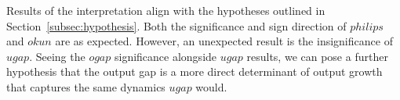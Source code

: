 \vspace{\baselineskip}
Results of the interpretation align with the hypotheses outlined in Section~\ref{subsec:hypothesis}.
Both the significance and sign direction of $philips$ and $okun$ are as expected.
However, an unexpected result is the insignificance of $ugap$.
Seeing the $ogap$ significance alongside $ugap$ results, we can pose a further hypothesis that the output gap is a more direct determinant of output growth that captures the same dynamics $ugap$ would.
